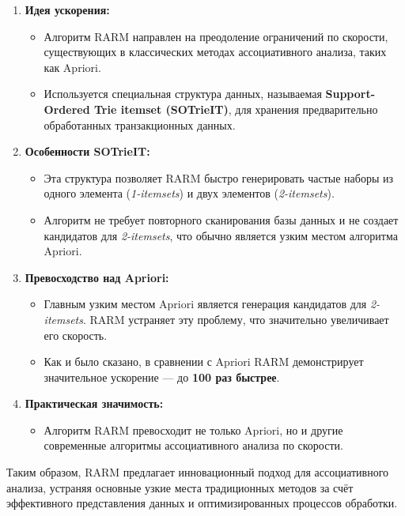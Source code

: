 \begin{enumerate}
    \item \textbf{Идея ускорения:}
    \begin{itemize}
        \item Алгоритм RARM направлен на преодоление ограничений по скорости, существующих в классических методах ассоциативного анализа, таких как Apriori.
        \item Используется специальная структура данных, называемая \textbf{Support-Ordered Trie itemset (SOTrieIT)}, для хранения предварительно обработанных транзакционных данных.
    \end{itemize}

    \item \textbf{Особенности SOTrieIT:}
    \begin{itemize}
        \item Эта структура позволяет RARM быстро генерировать частые наборы из одного элемента (\textit{1-itemsets}) и двух элементов (\textit{2-itemsets}).
        \item Алгоритм не требует повторного сканирования базы данных и не создает кандидатов для \textit{2-itemsets}, что обычно является узким местом алгоритма Apriori.
    \end{itemize}

    \item \textbf{Превосходство над Apriori:}
    \begin{itemize}
        \item Главным узким местом Apriori является генерация кандидатов для \textit{2-itemsets}. RARM устраняет эту проблему, что значительно увеличивает его скорость.
        \item Как и было сказано, в сравнении с Apriori RARM демонстрирует значительное ускорение --- до \textbf{100 раз быстрее}.
    \end{itemize}

    \item \textbf{Практическая значимость:}
    \begin{itemize}
        \item Алгоритм RARM превосходит не только Apriori, но и другие современные алгоритмы ассоциативного анализа по скорости.
    \end{itemize}
\end{enumerate}

Таким образом, RARM предлагает инновационный подход для ассоциативного анализа, устраняя основные узкие места традиционных методов за счёт эффективного представления данных и оптимизированных процессов обработки.

